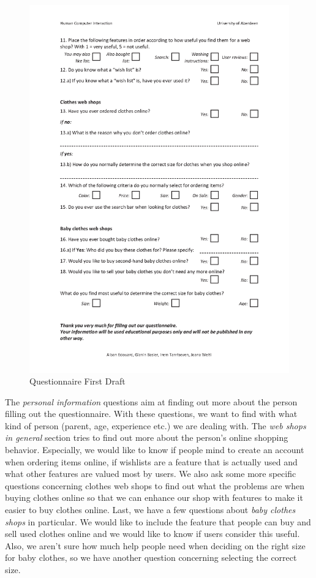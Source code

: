 \begin{figure}[H]
\begin{center}
\includegraphics[scale=0.75]{User_Involvement_Methods/Questionnaires/Questionnaire_Web_Shops_v2_2.png}
\caption{Questionnaire First Draft}
\label{fig:draft}
\end{center}
\end{figure}

\label{sec:explanations}
The \textit{personal information} questions aim at finding out more about the person filling out the questionnaire. With these questions, we want to find with what kind of person (parent, age, experience etc.) we are dealing with. The \textit{web shops in general} section tries to find out more about the person's online shopping behavior. Especially, we would like to know if people mind to create an account when ordering items online, if wishlists are a feature that is actually used and what other features are valued most by users.
We also ask some more specific questions concerning clothes web shops to find out what the problems are when buying clothes online so that we can enhance our shop with features to make it easier to buy clothes online. 
Last, we have a few questions about \textit{baby clothes shops} in particular. We would like to include the feature that people can buy and sell used clothes online and we would like to know if users consider this useful. Also, we aren't sure how much help people need when deciding on the right size for baby clothes, so we have another question concerning selecting the correct size. 


